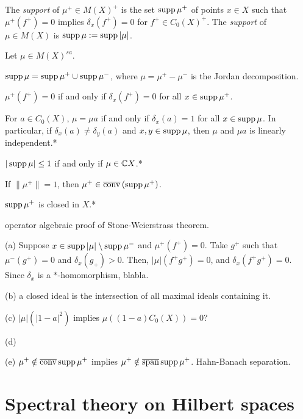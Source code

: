 \documentclass{../../large}
\begin{document}
\begin{prb}
The \emph{support} of $\mu^+\in M(X)^+$ is the set $\operatorname{supp}\mu^+$ of points $x\in X$ such that $\mu^+(f^+)=0$ implies $\delta_x(f^+)=0$ for $f^+\in C_0(X)^+$.
The \emph{support} of $\mu\in M(X)$ is $\operatorname{supp}\mu:=\operatorname{supp}|\mu|$.

Let $\mu\in M(X)^{sa}$.
\begin{parts}
\item $\operatorname{supp}\mu=\operatorname{supp}\mu^+\cup\operatorname{supp}\mu^-$, where $\mu=\mu^+-\mu^-$ is the Jordan decomposition.
\item $\mu^+(f^+)=0$ if and only if $\delta_x(f^+)=0$ for all $x\in\operatorname{supp}\mu^+$.
\item For $a\in C_0(X)$, $\mu=\mu a$ if and only if $\delta_x(a)=1$ for all $x\in\operatorname{supp}\mu$. In particular, if $\delta_x(a)\ne\delta_y(a)$ and $x,y\in\operatorname{supp}\mu$, then $\mu$ and $\mu a$ is linearly independent.*
\item $|\operatorname{supp}\mu|\le1$ if and only if $\mu\in\mathbb{C} X$.*
\item If $\|\mu^+\|=1$, then $\mu^+\in\overline{\operatorname{conv}}\,(\operatorname{supp}\mu^+)$.
\item $\operatorname{supp}\mu^+$ is closed in $X$.*
\item operator algebraic proof of Stone-Weierstrass theorem.
\end{parts}
\end{prb}
\begin{pf}
(a)
Suppose $x\in\operatorname{supp}|\mu|\setminus\operatorname{supp}\mu^-$ and $\mu^+(f^+)=0$.
Take $g^+$ such that $\mu^-(g^+)=0$ and $\delta_x(g_+)>0$.
Then, $|\mu|(f^+g^+)=0$, and $\delta_x(f^+g^+)=0$.
Since $\delta_x$ is a $*$-homomorphism, blabla.

(b) a closed ideal is the intersection of all maximal ideals containing it.

(c)
$|\mu|(|1-a|^2)$ implies $\mu((1-a)C_0(X))=0$?

(d)

(e)
$\mu^+\notin\overline{\operatorname{conv}}\operatorname{supp}\mu^+$ implies $\mu^+\notin\overline{\operatorname{span}}\operatorname{supp}\mu^+$.
Hahn-Banach separation.

\end{pf}

\begin{prb}

\end{prb}




\section{Spectral theory on Hilbert spaces}
\end{document}

